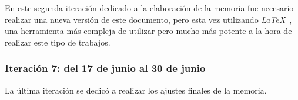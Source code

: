 En este segunda iteración dedicado a la elaboración de la memoria fue necesario realizar una nueva versión de este
documento, pero esta vez utilizando \textit{LaTeX}~\cite{url_latex}, una herramienta más compleja
de utilizar pero mucho más potente a la hora de realizar este tipo de trabajos.

\subsubsection{Iteración 7: del 17 de junio al 30 de junio}

La última iteración se dedicó a realizar los ajustes finales de la memoria.